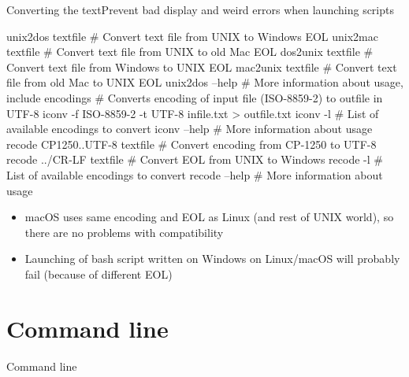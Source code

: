 \documentclass[compress, ucs, xelatex, 11pt, xcolor=svgnames,
  hyperref={
    bookmarks=true,
    unicode=true,
    colorlinks=true,
    pdftitle={Linux, command line and MetaCentrum},
    plainpages=false,
    pdfauthor={Vojtech Zeisek},
    pdfsubject={Course about use of Linux command line, writing shell scripts and using MetaCentrum of CESNET},
    pdfcreator={XeLaTeX},
    pdfkeywords={Linux, GNU, BASH, shell, command line, MetaCentrum},
    linkcolor=DarkRed,
    anchorcolor=DarkBlue,
    citecolor=Indigo,
    filecolor=NavyBlue,
    menucolor=DarkMagenta,
    urlcolor=DarkBlue,
    pdftex},
  url={hyphens, lowtilde} %
  ]{beamer}
\begin{document}
\begin{frame}[fragile]{Converting the text}{Prevent bad display and weird errors when launching scripts}
  \begin{bashcode}
    unix2dos textfile # Convert text file from UNIX to Windows EOL
    unix2mac textfile # Convert text file from UNIX to old Mac EOL
    dos2unix textfile # Convert text file from Windows to UNIX EOL
    mac2unix textfile # Convert text file from old Mac to UNIX EOL
    unix2dos --help # More information about usage, include encodings
    # Converts encoding of input file (ISO-8859-2) to outfile in UTF-8
    iconv -f ISO-8859-2 -t UTF-8 infile.txt > outfile.txt
    iconv -l # List of available encodings to convert
    iconv --help # More information about usage
    recode CP1250..UTF-8 textfile # Convert encoding from CP-1250 to UTF-8
    recode ../CR-LF textfile # Convert EOL from UNIX to Windows
    recode -l # List of available encodings to convert
    recode --help # More information about usage
  \end{bashcode}
  \begin{itemize}
    \item macOS uses same encoding and EOL as Linux (and rest of UNIX world), so there are no problems with compatibility
    \item Launching of bash script written on Windows on Linux/macOS will probably fail (because of different EOL)
  \end{itemize}
\end{frame}

\section{Command line}

\begin{frame}{Command line}
  \tableofcontents[currentsection, sectionstyle=show/hide, hideothersubsections]
\end{frame}
\end{document}
